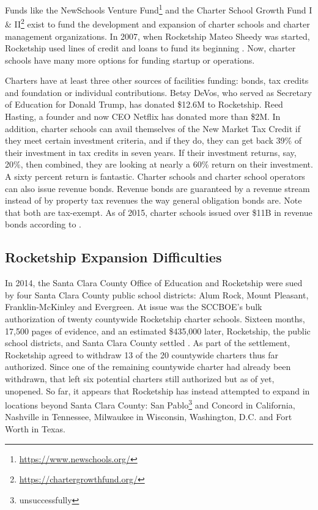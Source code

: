 Funds like the NewSchools Venture Fund\footnote{\url{https://www.newschools.org/}} and the Charter School Growth Fund I \& II\footnote{\url{https://chartergrowthfund.org/}} exist to fund the development and expansion of charter schools and charter management organizations. In 2007, when Rocketship Mateo Sheedy was started, Rocketship used lines of credit and loans to fund its beginning \parencite[260]{Danner2006}. Now, charter schools have many more options for funding startup or operations.

Charters have at least three other sources of facilities funding: bonds, tax credits and foundation or individual contributions. Betsy DeVos, who served as Secretary of Education for Donald Trump, has donated \$12.6M to Rocketship. Reed Hasting, a founder and now CEO Netflix has donated more than \$2M. In addition, charter schools can avail themselves of the New Market Tax Credit if they meet certain investment criteria, and if they do, they can get back 39\% of their investment  in tax credits in seven years. If their investment returns, say, 20\%, then combined, they are looking at nearly a 60\% return on their investment. A sixty percent return is fantastic. Charter schools and charter school operators can also issue revenue bonds. Revenue bonds are guaranteed by a revenue stream instead of by property tax revenues the way general obligation bonds are. Note that both are tax-exempt. As of 2015, charter schools issued over \$11B in revenue bonds according to \textcite{Clark-Herrera.etal2019}.

\subsection{Rocketship Expansion Difficulties}\label{sec:rocketship-expansion-difficulties}\indent

In 2014, the Santa Clara County Office of Education and Rocketship were sued by four Santa Clara County public school districts: Alum Rock, Mount Pleasant, Franklin-McKinley and Evergreen. At issue was the SCCBOE's bulk authorization of twenty countywide Rocketship charter schools. Sixteen months, 17,500 pages of evidence, and an estimated \$435,000 later, Rocketship, the public school districts, and Santa Clara County settled \parencite{Noguchi2015}. As part of the settlement, Rocketship agreed to withdraw 13 of the 20 countywide charters thus far authorized. Since one of the remaining countywide charter had already been withdrawn, that left six potential charters still authorized but as of yet, unopened. So far, it appears that Rocketship has instead attempted to expand in locations beyond Santa Clara County: San Pablo\footnote{unsuccessfully} and Concord in California, Nashville in Tennessee, Milwaukee in Wisconsin, Washington, D.C. and Fort Worth in Texas.

